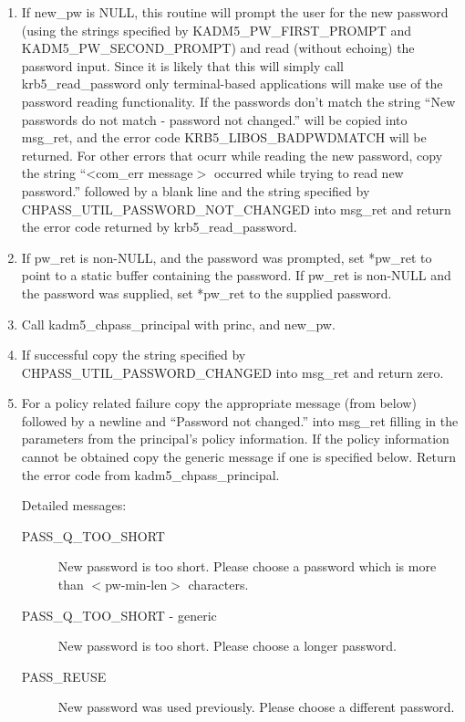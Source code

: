 \begin{enumerate}
\item If new_pw is NULL, this routine will prompt the user for the new
password (using the strings specified by KADM5_PW_FIRST_PROMPT and
KADM5_PW_SECOND_PROMPT) and read (without echoing) the password input.
Since it is likely that this will simply call krb5_read_password only
terminal-based applications will make use of the password reading
functionality. If the passwords don't match the string ``New passwords do
not match - password not changed.'' will be copied into msg_ret, and the
error code KRB5_LIBOS_BADPWDMATCH will be returned.  For other errors that
ocurr while reading the new password, copy the string ``<com_err message$>$
occurred while trying to read new password.'' followed by a blank line and
the string specified by CHPASS_UTIL_PASSWORD_NOT_CHANGED into msg_ret and
return the error code returned by krb5_read_password.

\item If pw_ret is non-NULL, and the password was prompted, set *pw_ret to
point to a static buffer containing the password.  If pw_ret is non-NULL
and the password was supplied, set *pw_ret to the supplied password.

\item Call kadm5_chpass_principal with princ, and new_pw.

\item If successful copy the string specified by CHPASS_UTIL_PASSWORD_CHANGED
into msg_ret and return zero.

\item For a policy related failure copy the appropriate message (from below) 
followed by a newline and ``Password not changed.'' into msg_ret
filling in the parameters from the principal's policy information. If
the policy information cannot be obtained copy the generic message if
one is specified below. Return the error code from
kadm5_chpass_principal.

Detailed messages:
\begin{description}

\item[PASS_Q_TOO_SHORT]
New password is too short. Please choose a
password which is more than $<$pw-min-len$>$ characters.

\item[PASS_Q_TOO_SHORT - generic]
New password is too short. Please choose a longer password.

\item[PASS_REUSE]
New password was used previously. Please choose a
different password.


\end{description}
\end{enumerate}
